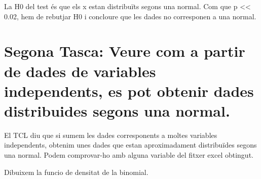 \documentclass[
]{article}
\newenvironment{Shaded}{\begin{snugshade}}{\end{snugshade}}
\newcommand{\CommentTok}[1]{\textcolor[rgb]{0.56,0.35,0.01}{\textit{#1}}}
\newcommand{\DecValTok}[1]{\textcolor[rgb]{0.00,0.00,0.81}{#1}}
\newcommand{\FunctionTok}[1]{\textcolor[rgb]{0.00,0.00,0.00}{#1}}
\newcommand{\NormalTok}[1]{#1}
\newcommand{\OtherTok}[1]{\textcolor[rgb]{0.56,0.35,0.01}{#1}}
\newcommand{\SpecialCharTok}[1]{\textcolor[rgb]{0.00,0.00,0.00}{#1}}
\begin{document}
La H0 del test és que els x estan distribuïts segons una normal. Com que
p \textless\textless{} 0.02, hem de rebutjar H0 i concloure que les
dades no corresponen a una normal.

\hypertarget{segona-tasca-veure-com-a-partir-de-dades-de-variables-independents-es-pot-obtenir-dades-distribuides-segons-una-normal.}{%
\section{Segona Tasca: Veure com a partir de dades de variables
independents, es pot obtenir dades distribuides segons una
normal.}\label{segona-tasca-veure-com-a-partir-de-dades-de-variables-independents-es-pot-obtenir-dades-distribuides-segons-una-normal.}}

El TCL diu que si sumem les dades corresponents a moltes variables
independents, obtenim unes dades que estan aproximadament distribuïdes
segons una normal. Podem comprovar-ho amb alguna variable del fitxer
excel obtingut.

\begin{Shaded}
\end{Shaded}

Dibuixem la funcio de densitat de la binomial.
\end{document}

